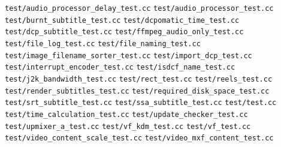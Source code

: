 \documentclass{article}
\newcommand{\co}[1]{\texttt{#1}}
\begin{document}
\co{test/audio\_processor\_delay\_test.cc}
\co{test/audio\_processor\_test.cc}
\co{test/burnt\_subtitle\_test.cc}
\co{test/dcpomatic\_time\_test.cc}
\co{test/dcp\_subtitle\_test.cc}
\co{test/ffmpeg\_audio\_only\_test.cc}
\co{test/file\_log\_test.cc}
\co{test/file\_naming\_test.cc}
\co{test/image\_filename\_sorter\_test.cc}
\co{test/import\_dcp\_test.cc}
\co{test/interrupt\_encoder\_test.cc}
\co{test/isdcf\_name\_test.cc}
\co{test/j2k\_bandwidth\_test.cc}
\co{test/rect\_test.cc}
\co{test/reels\_test.cc}
\co{test/render\_subtitles\_test.cc}
\co{test/required\_disk\_space\_test.cc}
\co{test/srt\_subtitle\_test.cc}
\co{test/ssa\_subtitle\_test.cc}
\co{test/test.cc}
\co{test/time\_calculation\_test.cc}
\co{test/update\_checker\_test.cc}
\co{test/upmixer\_a\_test.cc}
\co{test/vf\_kdm\_test.cc}
\co{test/vf\_test.cc}
\co{test/video\_content\_scale\_test.cc}
\co{test/video\_mxf\_content\_test.cc}
\end{document}
